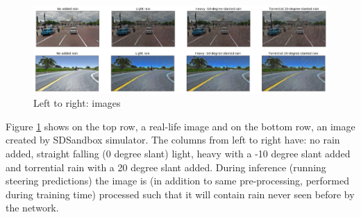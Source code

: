 
\begin{figure}[h!]
\centering
\includegraphics[width=\textwidth]{Figures/AutomoldRain.png}
\caption{Left to right: images}
\label{fig:AutomoldRoadAugmentationLibrary}
\end{figure}

Figure \ref{fig:AutomoldRoadAugmentationLibrary} shows on the top row, a real-life image and on the bottom row, an image created by SDSandbox simulator. The columns from left to right have: no rain added, straight falling (0 degree slant) light, heavy with a -10 degree slant added and torrential rain with a 20 degree slant added.  
During inference (running steering predictions) the image is (in addition to same pre-processing, performed during training time) processed such that it will contain rain never seen before by the network. 




